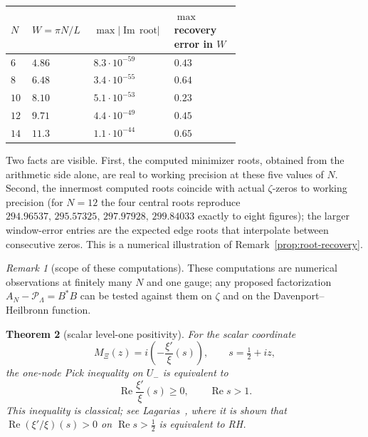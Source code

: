 \documentclass[11pt]{amsart}
\newtheorem{theorem}{Theorem}[section]
\theoremstyle{definition}
\theoremstyle{remark}
\newtheorem{remark}[theorem]{Remark}
\theoremstyle{definition}
\renewcommand{\Re}{\operatorname{Re}}
\renewcommand{\Im}{\operatorname{Im}}
\newcommand{\half}{\tfrac{1}{2}}
\begin{document}
\begin{longtable}{@{}p{0.06\linewidth}p{0.14\linewidth}p{0.18\linewidth}p{0.26\linewidth}@{}}
\toprule
$N$ & $W=\pi N/L$ & $\max|\Im\,\text{root}|$ & $\max$ recovery error in $W$ \\
\midrule
\endhead
$6$ & $4.86$ & $8.3\cdot10^{-59}$ & $0.43$ \\
$8$ & $6.48$ & $3.4\cdot10^{-55}$ & $0.64$ \\
$10$ & $8.10$ & $5.1\cdot10^{-53}$ & $0.23$ \\
$12$ & $9.71$ & $4.4\cdot10^{-49}$ & $0.45$ \\
$14$ & $11.3$ & $1.1\cdot10^{-44}$ & $0.65$ \\
\bottomrule
\end{longtable}

Two facts are visible.  First, the computed minimizer roots, obtained from the arithmetic side
alone, are real to working precision at these five values of $N$.  Second, the innermost computed
roots coincide with actual $\zeta$-zeros to working precision (for $N=12$ the four central roots reproduce
$294.96537,\,295.57325,\,297.97928,\,299.84033$ exactly to eight figures); the larger window-error entries
are the expected edge roots that interpolate between consecutive zeros.  This is a numerical illustration of
Remark~\ref{prop:root-recovery}.

\begin{remark}[scope of these computations]\label{rmk:harness-scope}
These computations are numerical observations at finitely many $N$ and one gauge; any proposed
factorization $A_N-\mathcal P_\Lambda=B^*B$ can be tested against them on $\zeta$ and on the
Davenport--Heilbronn function.
\end{remark}

\begin{theorem}[scalar level-one positivity]\label{thm:level-one-scalar}
For the scalar coordinate
\[
   M_\Xi(z)=i\left(-\frac{\xi'}{\xi}(s)\right),\qquad s=\half+iz,
\]
the one-node Pick inequality on $U_-$ is equivalent to
\[
   \Re\frac{\xi'}{\xi}(s)\ge0,\qquad \Re s>1.
\]
This inequality is classical; see Lagarias~\cite{Lagarias1999}, where it is shown that
$\Re(\xi'/\xi)(s)>0$ on $\Re s>\half$ is equivalent to RH.
\end{theorem}
\end{document}
